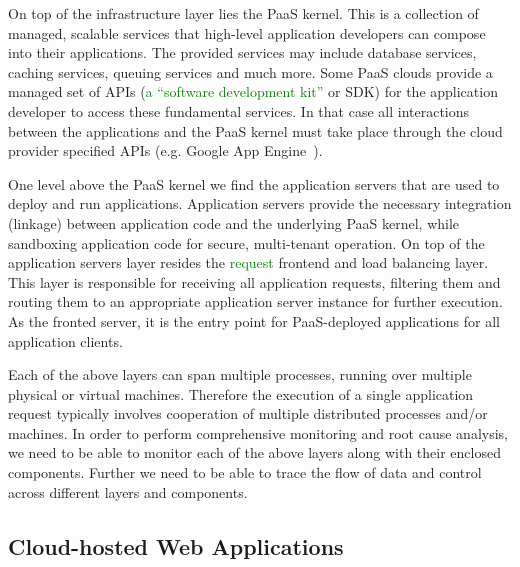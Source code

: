 On top of the infrastructure layer lies the PaaS kernel. This is a collection of managed, scalable
services that high-level application developers can compose into their applications. The provided services
may include database services, caching services, queuing services and much more. Some PaaS clouds
provide a managed set of APIs (\textcolor{green}{a ``software development
kit''} or SDK) for the application developer to access these fundamental services. 
In that case all interactions between the applications and the PaaS kernel must take place through
the cloud provider specified APIs (e.g. Google App Engine~\cite{XXX}). 

One level above the PaaS kernel we find the application servers that are used to deploy and run
applications. Application servers provide the necessary integration (linkage) between application code and the
underlying PaaS kernel, while sandboxing application code for secure, multi-tenant operation. On top
of the application servers layer resides the \textcolor{green}{request}
frontend and load balancing layer. This layer is responsible
for receiving all application requests, filtering them and routing them to an appropriate application
server instance for further execution. As the fronted server, it is the entry point for PaaS-deployed
applications for all application clients.

Each of the above layers can span multiple processes, running over multiple physical or virtual
machines. Therefore the execution of a single application request typically involves cooperation
of multiple distributed processes and/or machines. In order to perform comprehensive monitoring
and root cause analysis, we need to be able to monitor each of the above layers along with their
enclosed components. Further we need to be able to trace the flow of data and control
across different layers and components.

\subsection{Cloud-hosted Web Applications} 


